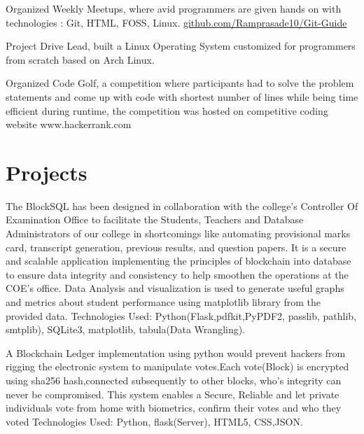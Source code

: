 \documentclass[]{deedy-resume-openfont}
\begin{document}
\begin{tightemize}
\item Organized Weekly Meetups, where avid programmers are given hands on with
technologies : Git, HTML, FOSS, Linux. \href{https://github.com/Ramprasade10/Git-Guide}{github.com/Ramprasade10/Git-Guide}
\item Project Drive Lead, built a Linux Operating System customized for programmers from scratch based on Arch Linux.
\item Organized Code Golf, a competition where participants had to solve the problem statements and come up with code with shortest number of
lines while being time efficient during runtime, the competition was hosted on competitive coding website www.hackerrank.com
\end{tightemize}
\sectionsep


\section{Projects}

The BlockSQL has been designed in collaboration with the college's Controller Of Examination Office to facilitate the Students, Teachers and Database Administrators of our college in  shortcomings like automating provisional marks card, transcript generation, previous results, and question papers. It is a secure and scalable application implementing the principles of blockchain into database to ensure data integrity and consistency to help smoothen the operations at the COE’s office.
Data Analysis and visualization is used to generate useful graphs and metrics about student performance using matplotlib library from the provided data.
Technologies Used: Python(Flask,pdfkit,PyPDF2, passlib, pathlib, smtplib), SQLite3, matplotlib, tabula(Data Wrangling).
\sectionsep

A Blockchain Ledger implementation using python would prevent hackers from
rigging the electronic system to manipulate votes.Each vote(Block) is encrypted
using sha256 hash,connected subsequently to other blocks, who’s integrity can never
be compromised. This system enables a Secure, Reliable and let private individuals
vote from home with biometrics, confirm their votes and who they voted
\newline Technologies Used: Python, flask(Server), HTML5, CSS,JSON.
\sectionsep
\end{document}

